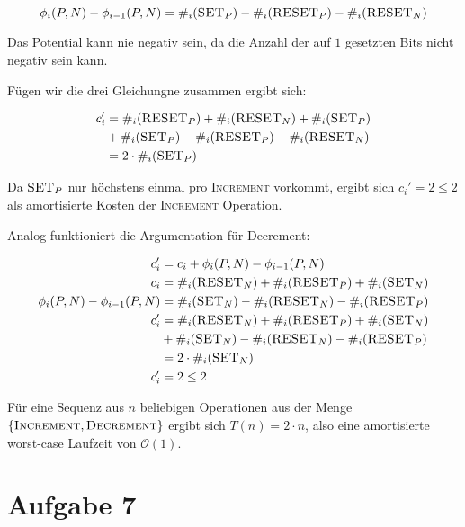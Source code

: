 \documentclass[parskip=half,a4paper]{scrartcl}
\begin{document}
\begin{equation}
\phi_i(P,N) - \phi_{i-1}(P,N) = \#_i(\textsc{SET}_P) - \#_i(\textsc{RESET}_P) - \#_i(\textsc{RESET}_N)
\end{equation}

Das Potential kann nie negativ sein, da die Anzahl der auf $1$ gesetzten Bits nicht negativ sein kann.

Fügen wir die drei Gleichungne zusammen ergibt sich:

\begin{equation}
\begin{aligned}
c_i' &= \#_i(\textsc{RESET}_P) + \#_i(\textsc{RESET}_N) + \#_i(\textsc{SET}_P) \\ &+ \#_i(\textsc{SET}_P) - \#_i(\textsc{RESET}_P) - \#_i(\textsc{RESET}_N)\\
&= 2 \cdot \#_i(\textsc{SET}_P)\\
\end{aligned}
\end{equation}

Da $\textsc{SET}_P$ nur höchstens einmal pro \textsc{Increment} vorkommt, ergibt sich $c_i' = 2 \le 2$ als amortisierte Kosten der \textsc{Increment} Operation.

Analog funktioniert die Argumentation für Decrement:

\begin{equation}
\begin{aligned}
c_i' &= c_i + \phi_i(P,N) - \phi_{i-1}(P,N)\\
c_i &= \#_i(\textsc{RESET}_N) + \#_i(\textsc{RESET}_P) + \#_i(\textsc{SET}_N)\\
\phi_i(P,N) - \phi_{i-1}(P,N) &= \#_i(\textsc{SET}_N) - \#_i(\textsc{RESET}_N) - \#_i(\textsc{RESET}_P)\\
c_i' &= \#_i(\textsc{RESET}_N) + \#_i(\textsc{RESET}_P) + \#_i(\textsc{SET}_N) \\ &+ \#_i(\textsc{SET}_N) - \#_i(\textsc{RESET}_N) - \#_i(\textsc{RESET}_P)\\
&= 2 \cdot \#_i(\textsc{SET}_N)\\
c_i' &= 2 \le 2
\end{aligned}
\end{equation}

Für eine Sequenz aus $n$ beliebigen Operationen aus der Menge $\{\textsc{Increment}, \textsc{Decrement}\}$ ergibt sich $T(n) = 2 \cdot n$, also eine amortisierte worst-case Laufzeit von $\mathcal{O}(1)$.

\section*{Aufgabe 7}
\end{document}
